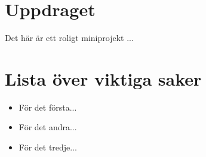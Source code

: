 \documentclass{article}
\begin{document}
 
\section*{Uppdraget}
\par 
Det här är ett roligt miniprojekt ...
\section*{Lista över viktiga saker}
\begin{itemize} 
\item För det första...
\item För det andra...
\item För det tredje...
\end{itemize} 
\end{document}
